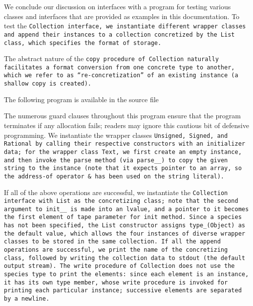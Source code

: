 \def\Subsubsection#1{\subsubsection{#1}
}

We conclude our discussion on interfaces with a program for testing various
classes and interfaces that are provided as examples in this documentation.
To test the \tt{Collection} interface, we instantiate different wrapper
classes and append their instances to a collection concretized
by the \tt{List} class, which specifies the format of storage.

The abstract nature of the \tt{copy} procedure of \tt{Collection} naturally
facilitates a format conversion from one concrete type to another, which we refer
to as ``re-concretization'' of an existing instance (a shallow copy is created).

The following program is available in the source file 

The numerous guard clauses throughout this program ensure
that the program terminates if any allocation fails;
readers may ignore this cautious bit of defensive programming.
We instantiate the wrapper classes \tt{Unsigned}, \tt{Signed}, and \tt{Rational}
by calling their respective constructors with an initializer data; for the
wrapper class \tt{Text}, we first create an empty instance, and then invoke the
\tt{parse} method (via \tt{parse__}) to copy the given string to the instance
(note that it expects pointer to an array, so the address-of
operator \tt{&} has been used on the string literal).

\enlargethispage*{\baselineskip}
\pagebreak

If all of the above operations are successful, we instantiate the
\tt{Collection} interface with \tt{List} as the concretizing class; note
that the second argument to \tt{init__} is made into an lvalue, and a pointer
to it becomes the first element of \tt{tape} parameter for \tt{init} method.
Since a \tt{species} has not been specified, the \tt{List} constructor
assigns \tt{type_(Object)} as the default value, which allows the four
instances of diverse wrapper classes to be stored in the same collection.
If all the \tt{append} operations are successful, we print the name of the
concretizing class, followed by writing the collection data to \tt{stdout}
(the default output stream).
The \tt{write} procedure of \tt{Collection} does not use the \tt{species}
type to print the elements: since each element is an instance, it has its own
\tt{type} member, whose \tt{write} procedure is invoked for printing each
particular instance; successive elements are separated by a newline.\\

